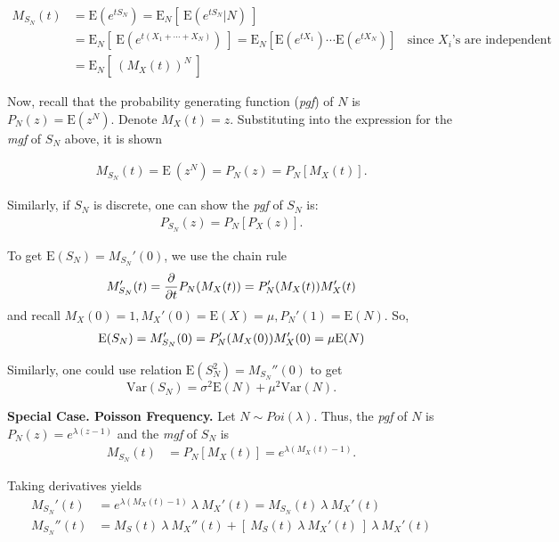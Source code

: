 \documentclass[]{book}
\theoremstyle{definition}
\theoremstyle{definition}
\theoremstyle{definition}
\theoremstyle{remark}
\begin{document}
\[\begin{aligned}
M_{S_N}(t) &= \mathrm{E}(e^{t S_N})=\mathrm{E}_N[~\mathrm{E}(e^{tS_N}|N)~]\\
&= \mathrm{E}_N \left[ ~\mathrm{E}\left( e^{t(X_1+\cdots+X_N)}\right) ~\right] = 
\mathrm{E}_N \left[ \mathrm{E}(e^{tX_1})\cdots\mathrm{E}(e^{tX_N}) \right] ~~~~ \text{since } X_i \text{'s are independent} \\
&= \mathrm{E}_N[~(M_{X}(t))^N~]
\end{aligned}\]

Now, recall that the probability generating function (\emph{pgf}) of
\(N\) is \(P_N(z) = \mathrm{E}(z^N)\). Denote \(M_{X}(t)=z\).
Substituting into the expression for the \emph{mgf} of \(S_N\) above, it
is shown

\[\begin{aligned}
M_{S_N}(t) = \mathrm{E~}(z^N)  = P_{N}(z) = P_{N}[M_{X}(t)].
\end{aligned}\]

Similarly, if \(S_N\) is discrete, one can show the \emph{pgf} of
\(S_N\) is: \[\begin{aligned}
P_{S_N}(z) = P_{N}[P_{X}(z)].
\end{aligned}\]

To get \(\mathrm{E}(S_N) = M_{S_N}'(0)\), we use the chain rule \[
M_{S_N}'(t) = \frac{\partial}{\partial t} P_{N}(M_{X}(t)) = P_{N}'(M_{X}(t)) M_{X}'(t)\\
\] and recall
\(M_{X}(0) = 1, M_{X}'(0) = \mathrm{E}(X) = \mu, P_{N}'(1) = \mathrm{E}(N)\).
So, \[\begin{aligned}
\mathrm{E}(S_N) = M_{S_N}'(0) = P_{N}'(M_{X}(0)) M_{X}'(0) = \mu {\rm E}(N)
\end{aligned}\]

Similarly, one could use relation \(\mathrm{E}(S_N^2) = M_{S_N}''(0)\)
to get
\[\mathrm{Var}(S_N) = \sigma^2 \mathrm{E}(N) + \mu^2 \mathrm{Var}(N).\]

\textbf{Special Case. Poisson Frequency.} Let \(N \sim Poi (\lambda)\).
Thus, the \emph{pgf} of \(N\) is \(P_N (z) = e^{\lambda(z-1)}\) and the
\emph{mgf} of \(S_N\) is \[\begin{aligned}
M_{S_N}(t) &= P_N[M_X(t)] = e^{\lambda(M_{X}(t) - 1)}.
\end{aligned}\]

Taking derivatives yields \[\begin{aligned}
M_{S_N}'(t) &= e^{\lambda(M_{X}(t) - 1)}~ \lambda~ M_{X}'(t) = M_{S_N}(t) ~\lambda ~M_{X}'(t)\\
M_{S_N}''(t) &= M_{S}(t) ~\lambda~ M_{X}''(t) + [~M_{S}(t)~\lambda~ M_{X}'(t)~] ~\lambda~ M_{X}'(t)
\end{aligned}\]
\end{document}
